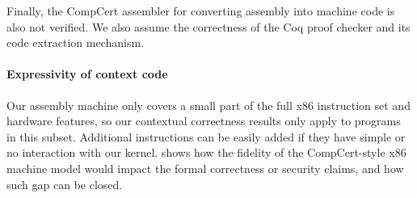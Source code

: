 
Finally, the CompCert assembler for converting assembly into machine
code is also not verified. We also assume the correctness of the Coq
proof checker and its code extraction mechanism.


\paragraph{Expressivity of context code} 
Our assembly machine only covers a small part of the full x86
instruction set and hardware features, so our contextual correctness results only apply to
programs in this subset. Additional instructions 
can be easily added if they have simple or no interaction with our
kernel.  \citet[Section 6]{costanzo16} shows how the fidelity of the
CompCert-style x86 machine model would impact the formal correctness
or security claims, and how such gap can be closed.


